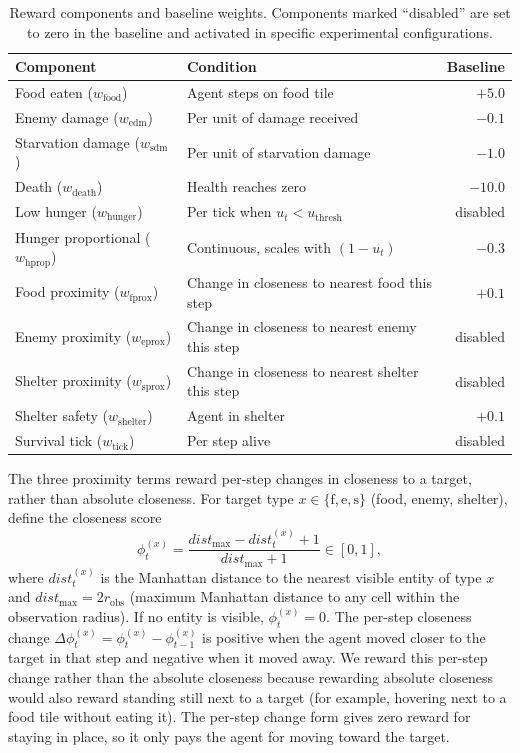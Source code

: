 \documentclass[12pt,a4paper,titlepage]{article}
\begin{document}
\begin{table}[h]
\centering
\caption{Reward components and baseline weights. Components marked ``disabled'' are set to zero in the baseline and activated in specific experimental configurations.}
\label{tab:default_rewards}
\small
\begin{tabular}{llr}
\toprule
Component & Condition & Baseline \\
\midrule
Food eaten ($w_\text{food}$)          & Agent steps on food tile              & $+5.0$ \\
Enemy damage ($w_\text{edm}$)         & Per unit of damage received           & $-0.1$ \\
Starvation damage ($w_\text{sdm}$)    & Per unit of starvation damage         & $-1.0$ \\
Death ($w_\text{death}$)              & Health reaches zero                   & $-10.0$ \\
Low hunger ($w_\text{hunger}$)        & Per tick when $u_t < u_\text{thresh}$ & disabled \\
Hunger proportional ($w_\text{hprop}$) & Continuous, scales with $(1 - u_t)$  & $-0.3$ \\
Food proximity ($w_\text{fprox}$)     & Change in closeness to nearest food this step    & $+0.1$ \\
Enemy proximity ($w_\text{eprox}$)    & Change in closeness to nearest enemy this step   & disabled \\
Shelter proximity ($w_\text{sprox}$)  & Change in closeness to nearest shelter this step & disabled \\
Shelter safety ($w_\text{shelter}$)   & Agent in shelter                      & $+0.1$ \\
Survival tick ($w_\text{tick}$)       & Per step alive                        & disabled \\
\bottomrule
\end{tabular}
\end{table}


The three proximity terms reward per-step changes in closeness to a target, rather than absolute closeness. For target type $x \in \{\text{f}, \text{e}, \text{s}\}$ (food, enemy, shelter), define the closeness score
\begin{equation}
\phi_t^{(x)} = \frac{dist_\text{max} - dist_t^{(x)} + 1}{dist_\text{max} + 1} \in [0, 1],
\end{equation}
where $dist_t^{(x)}$ is the Manhattan distance to the nearest visible entity of type $x$ and $dist_\text{max} = 2r_\text{obs}$ (maximum Manhattan distance to any cell within the observation radius). If no entity is visible, $\phi_t^{(x)} = 0$. The per-step closeness change $\Delta\phi_t^{(x)} = \phi_t^{(x)} - \phi_{t-1}^{(x)}$ is positive when the agent moved closer to the target in that step and negative when it moved away. We reward this per-step change rather than the absolute closeness because rewarding absolute closeness would also reward standing still next to a target (for example, hovering next to a food tile without eating it). The per-step change form gives zero reward for staying in place, so it only pays the agent for moving toward the target.
\end{document}
